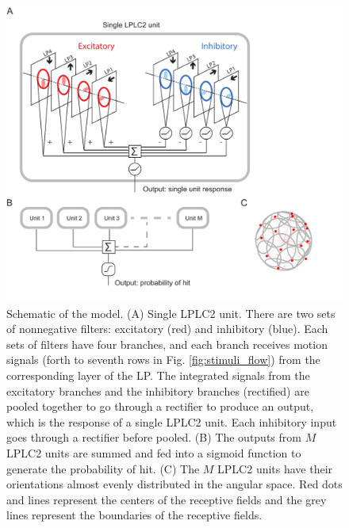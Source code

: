 \documentclass[pdftex,9pt,lineno]{elife}
\begin{document}
\begin{figure}
\end{figure}

\begin{figure}
\includegraphics[width=\linewidth]{figures/model_sketch_paper.pdf}
\caption{Schematic of the model. (A) Single LPLC2 unit. There are two sets of nonnegative filters: excitatory (red) and inhibitory (blue). Each sets of filters have four branches, and each branch receives motion signals (forth to seventh rows in Fig. \ref{fig:stimuli_flow}) from the corresponding layer of the LP. The integrated signals from the excitatory branches and the inhibitory branches (rectified) are pooled together to go through a rectifier to produce an output, which is the response of a single LPLC2 unit. Each inhibitory input goes through a rectifier before pooled. (B) The outputs from $M$ LPLC2 units are summed and fed into a sigmoid function to generate the probability of hit. (C) The $M$ LPLC2 units have their orientations almost evenly distributed in the angular space. Red dots and lines represent the centers of the receptive fields and the grey lines represent the boundaries of the receptive fields.}

\end{figure}
\end{document}
